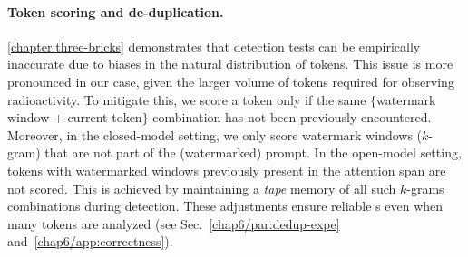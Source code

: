 \paragraph{Token scoring and de-duplication.}
\autoref{chapter:three-bricks} demonstrates that detection tests can be empirically inaccurate due to biases in the natural distribution of tokens. 
This issue is more pronounced in our case, given the larger volume of tokens required for observing radioactivity. 
To mitigate this, we score a token only if the same $\{$watermark window + current token$\}$ combination has not been previously encountered.
Moreover, in the closed-model setting, we only score watermark windows ($k$-gram) that are not part of the (watermarked) prompt. 
In the open-model setting, tokens with watermarked windows previously present in the attention span are not scored. 
This is achieved by maintaining a \emph{tape} memory of all such $k$-grams combinations during detection.
These adjustments ensure reliable \pval s even when many tokens are analyzed (see Sec.~\ref{chap6/par:dedup-expe} and~\ref{chap6/app:correctness}).






